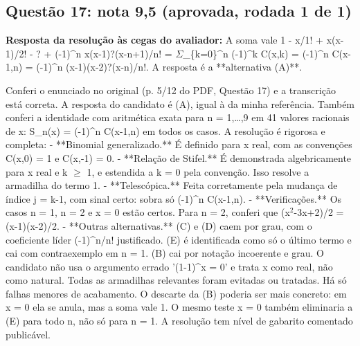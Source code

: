 \documentclass{article}%
\begin{document}
\subsection*{Questão 17: nota 9,5 (aprovada, rodada 1 de 1)}%
\textbf{Resposta da resolução às cegas do avaliador:} A soma vale 1 - x/1! + x(x-1)/2! - ? + (-1)\^{}n x(x-1)?(x-n+1)/n! = $\Sigma$\_\{k=0\}\^{}n (-1)\^{}k C(x,k) = (-1)\^{}n C(x-1,n) = (-1)\^{}n (x-1)(x-2)?(x-n)/n!. A resposta é a **alternativa (A)**.\par %
Conferi o enunciado no original (p. 5/12 do PDF, Questão 17) e a transcrição está correta. A resposta do candidato é (A), igual à da minha referência. Também conferi a identidade com aritmética exata para n = 1,\ldots{},9 em 41 valores racionais de x: S\_n(x) = (-1)\^{}n C(x-1,n) em todos os casos.\newline%
\newline%
A resolução é rigorosa e completa:\newline%
{-} **Binomial generalizado.** É definido para x real, com as convenções C(x,0) = 1 e C(x,-1) = 0.\newline%
{-} **Relação de Stifel.** É demonstrada algebricamente para x real e k $\geq$ 1, e estendida a k = 0 pela convenção. Isso resolve a armadilha do termo 1.\newline%
{-} **Telescópica.** Feita corretamente pela mudança de índice j = k-1, com sinal certo: sobra só (-1)\^{}n C(x-1,n).\newline%
{-} **Verificações.** Os casos n = 1, n = 2 e x = 0 estão certos. Para n = 2, conferi que (x$^2$-3x+2)/2 = (x-1)(x-2)/2.\newline%
{-} **Outras alternativas.** (C) e (D) caem por grau, com o coeficiente líder (-1)\^{}n/n! justificado. (E) é identificada como só o último termo e cai com contraexemplo em n = 1. (B) cai por notação incoerente e grau.\newline%
\newline%
O candidato não usa o argumento errado '(1-1)\^{}x = 0' e trata x como real, não como natural. Todas as armadilhas relevantes foram evitadas ou tratadas.\newline%
\newline%
Há só falhas menores de acabamento. O descarte da (B) poderia ser mais concreto: em x = 0 ela se anula, mas a soma vale 1. O mesmo teste x = 0 também eliminaria a (E) para todo n, não só para n = 1. A resolução tem nível de gabarito comentado publicável.%
\end{document}

